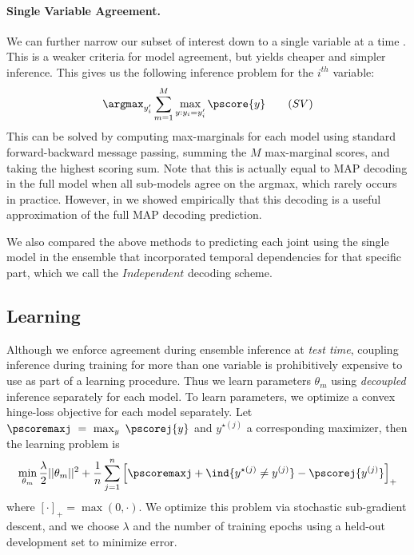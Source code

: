 \paragraph{Single Variable Agreement.} 

We can further narrow our subset of interest down to a single variable
at a time \cite{weisssapp10}.  This is a weaker criteria for model
agreement, but yields cheaper and simpler inference.  This gives us
the following inference problem for the $i^{th}$ variable:
\begin{equation}
\argmax_{y_i'} \sum_{m=1}^M \max_{y: y_i=y_i'}\pscore{y} \quad{}\quad{(SV)}
\end{equation}
This can be solved by computing max-marginals for each model using standard forward-backward message passing, summing the $M$ max-marginal scores, and taking the highest scoring sum.
Note that this is actually equal to MAP decoding in the full model when  
all sub-models agree on the argmax, which rarely occurs in practice. However, in \cite{weisssapp10} we showed
empirically that this decoding is a useful approximation
of the full MAP decoding prediction. 

We also compared the above methods to predicting each joint using the single model in
the ensemble that incorporated temporal dependencies for that
specific part, which we call the $Independent$ decoding scheme.


\subsection{Learning} Although we enforce agreement during ensemble inference 
at {\em test time}, coupling inference during training for more than one 
variable is prohibitively expensive to use as part of a learning procedure.  
Thus we learn
parameters $\theta_m$ using {\em decoupled} inference separately for
each model. To learn parameters, we optimize a convex hinge-loss
objective for each model separately. Let $\pscoremaxj~=~\max_y~\pscorej{y}$ and $y^{\star(j)}$ a corresponding maximizer, then the learning problem is 
{\small
\begin{align*}
\min_{\theta_m} \frac{\lambda}{2}||\theta_m||^2 +
\frac{1}{n}\sum_{j=1}^n \left[ \pscoremaxj + \ind{y^{\star(j)} \neq y^{(j)}} - \pscorej{y^{(j)}}  \right]_+
\end{align*}}
where $[\cdot]_+ = \max(0,\cdot)$.
We optimize
this problem via stochastic sub-gradient descent, and we choose
$\lambda$ and the number of training epochs using a held-out
development set to minimize error.



